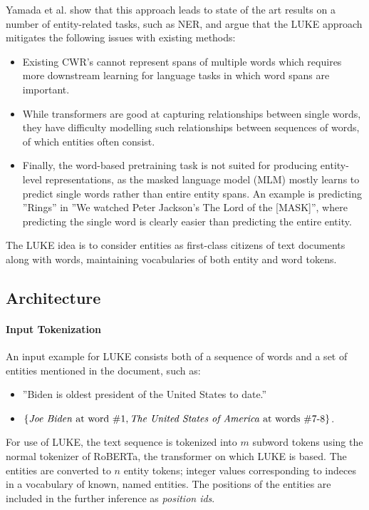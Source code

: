 \documentclass[main.tex]{subfiles}
\begin{document}
Yamada et al. show that this approach leads to state of the art results on a number of entity-related tasks, such as NER, and argue that the LUKE approach mitigates the following issues with existing methods:
\begin{itemize}
    \item Existing CWR's cannot represent spans of multiple words which requires more downstream learning for language tasks in which word spans are important.
    \item While transformers are good at capturing relationships between single words, they have difficulty modelling such relationships between sequences of words, of which entities often consist.
    \item Finally, the word-based pretraining task is not suited for producing entity-level representations, as the masked language model (MLM) mostly learns to predict single words rather than entire entity spans.
        An example is predicting ''Rings'' in ''We watched Peter Jackson's The Lord of the [MASK]'', where predicting the single word is clearly easier than predicting the entire entity.
\end{itemize}
The LUKE idea is to consider entities as first-class citizens of text documents along with words, maintaining vocabularies of both entity and word tokens.
\subsection{Architecture}

\paragraph{Input Tokenization}
An input example for LUKE consists both of a sequence of words and a set of entities mentioned in the document, such as:
\begin{itemize}
    \item ''Biden is oldest president of the United States to date.''
    \item $\{\text{\emph{Joe Biden} at word \#1}, \text{\emph{The United States of America} at words \#7-8}\}$.
\end{itemize}
For use of LUKE, the text sequence is tokenized into $m$ subword tokens using the normal tokenizer of RoBERTa, the transformer on which LUKE is based.
The entities are converted to $n$ entity tokens; integer values corresponding to indeces in a vocabulary of known, named entities.
The positions of the entities are included in the further inference as \emph{position ids}.
\end{document}
